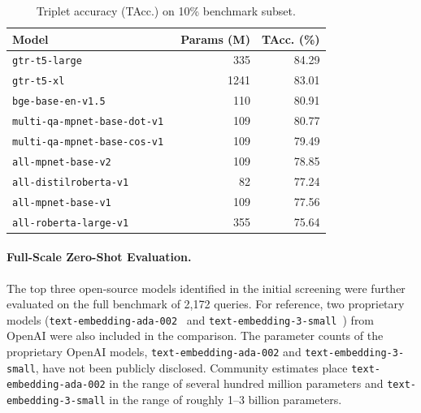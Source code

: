 \documentclass[a4paper,fleqn]{cas-dc}
\begin{document}
\begin{table}[htbp]
\centering
\caption{Triplet accuracy (TAcc.) on 10\% benchmark subset.}
\label{tab:triplet_eval_subset}
\begin{tabularx}{\linewidth}{lrr}
\toprule
\textbf{Model} & \textbf{Params (M)} & \textbf{TAcc. (\%)} \\
\midrule
\texttt{gtr-t5-large}~\cite{gtr-t5-large}               & 335   & 84.29 \\
\texttt{gtr-t5-xl}~\cite{gtr-t5-xl}                     & 1241  & 83.01 \\
\texttt{bge-base-en-v1.5}~\cite{bge-base-en-v1.5}       & 110   & 80.91 \\
\texttt{multi-qa-mpnet-base-dot-v1}~\cite{multi-qa-mpnet-base-dot-v1} & 109 & 80.77 \\
\texttt{multi-qa-mpnet-base-cos-v1}~\cite{multi-qa-mpnet-base-cos-v1} & 109 & 79.49 \\
\texttt{all-mpnet-base-v2}~\cite{all-mpnet-base-v2}     & 109   & 78.85 \\
\texttt{all-distilroberta-v1}~\cite{all-distilroberta-v1} & 82   & 77.24 \\
\texttt{all-mpnet-base-v1}~\cite{all-mpnet-base-v1}     & 109   & 77.56 \\
\texttt{all-roberta-large-v1}~\cite{all-roberta-large-v1} & 355  & 75.64 \\
\bottomrule
\end{tabularx}
\end{table}

\paragraph{Full-Scale Zero-Shot Evaluation.}  
The top three open-source models identified in the initial screening were further evaluated on the full benchmark of 2,172 queries. For reference, two proprietary models (\texttt{text-embedding-ada-002}~\cite{text-embedding-ada-002} and \texttt{text-embedding-3-small}~\cite{text-embedding-3-small}) from OpenAI were also included in the comparison. The parameter counts of the proprietary OpenAI models, \texttt{text-embedding-ada-002} and \texttt{text-embedding-3-small}, have not been publicly disclosed. Community estimates place \texttt{text-embedding-ada-002} in the range of several hundred million parameters and \texttt{text-embedding-3-small} in the range of roughly 1–3 billion parameters.
\end{document}
